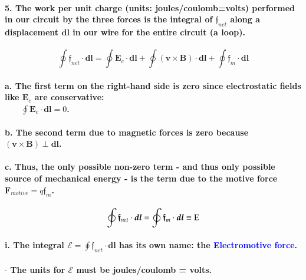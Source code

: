 \documentclass{article}
\begin{document}
\paragraph{5. The work per unit charge (units: joules/coulomb=volts) performed in our circuit by the three forces is the integral of $\boldsymbol{\mathfrak{f}}_{net}$ along a displacement $\boldsymbol{dl}$ in our wire for the entire circuit (a loop).}
\begin{equation*}
    \oint\boldsymbol{\mathfrak{f}}_{net}\cdot\boldsymbol{dl}=\oint\boldsymbol{E}_c\cdot\boldsymbol{dl}+\oint(\boldsymbol{v}\times\boldsymbol{B})\cdot\boldsymbol{dl}+\oint\boldsymbol{\mathfrak{f}}_m\cdot\boldsymbol{dl}
\end{equation*}
\paragraph{\indent a. The first term on the right-hand side is zero since electrostatic fields like $\boldsymbol{E}_c$ are conservative:\\  
$\quad\quad\oint\boldsymbol{E}_c\cdot\boldsymbol{dl}=0$.}
\paragraph{\indent b. The second term due to magnetic forces is zero because $(\boldsymbol{v}\times\boldsymbol{B})\perp\boldsymbol{dl}$.}
\paragraph{\indent c. Thus, the only possible non-zero term - and thus only possible source of mechanical energy - is the term due to the motive force $\boldsymbol{F}_{motive}=q\boldsymbol{\mathfrak{f}}_m$.}
\begin{equation*}
    \oint\boldsymbol{\mathfrak{f}}_{net}\cdot\boldsymbol{dl}=\oint\boldsymbol{\mathfrak{f}}_m\cdot\boldsymbol{dl}\equiv\textsc{E}
\end{equation*}
\paragraph{\indent\indent i. The integral $\mathcal{E}=\oint\boldsymbol{\mathfrak{f}}_{net}\cdot\boldsymbol{dl}$ has its own name: the \textcolor{blue}{Electromotive force}.}
\paragraph{\indent\indent $\cdot$ The units for $\mathcal{E}$ must be joules/coulomb = volts.}
\end{document}

